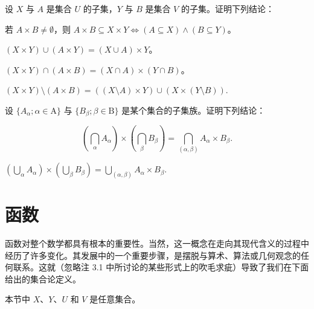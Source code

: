 \begin{exercises}
设 $X$ 与 $A$ 是集合 $U$ 的子集，$Y$ 与 $B$ 是集合 $V$ 的子集。证明下列结论：

\begin{items}
\item

若 $ A \times B \neq \emptyset $，则 $ A \times B \subseteq X \times Y \Leftrightarrow (A \subseteq X) \land (B \subseteq Y) $。

\item

$ (X \times Y) \cup (A \times Y) = (X \cup A) \times Y $。

\item

$ (X \times Y) \cap (A \times B) = (X \cap A) \times (Y \cap B) $。

\item

$ (X \times Y) \setminus (A \times B) = ((X \setminus A) \times Y) \cup (X \times (Y \setminus B)). $

\end{items}

\item

设 $\{A_\alpha; \alpha \in \mathrm{A}\}$ 与 $\{B_\beta; \beta \in \mathrm{B}\}$ 是某个集合的子集族。证明下列结论：

\[
\left(\bigcap_{\alpha}A_{\alpha}\right)\times\left(\bigcap_{\beta}B_{\beta}\right)=\bigcap_{(\alpha,\beta)}A_{\alpha}\times B_{\beta}.
\]

\begin{items}
\item[（b）]

$ (\bigcup_{\alpha} A_{\alpha}) \times (\bigcup_{\beta} B_{\beta}) = \bigcup_{(\alpha, \beta)} A_{\alpha} \times B_{\beta}. $

\end{items}

\end{exercises}

\section{函数}

函数对整个数学都具有根本的重要性。当然，这一概念在走向其现代含义的过程中经历了许多变化。其发展中的一个重要步骤，是摆脱与算术、算法或几何观念的任何联系。这就（忽略注 3.1 中所讨论的某些形式上的吹毛求疵）导致了我们在下面给出的集合论定义。

本节中 $X$、$Y$、$U$ 和 $V$ 是任意集合。

